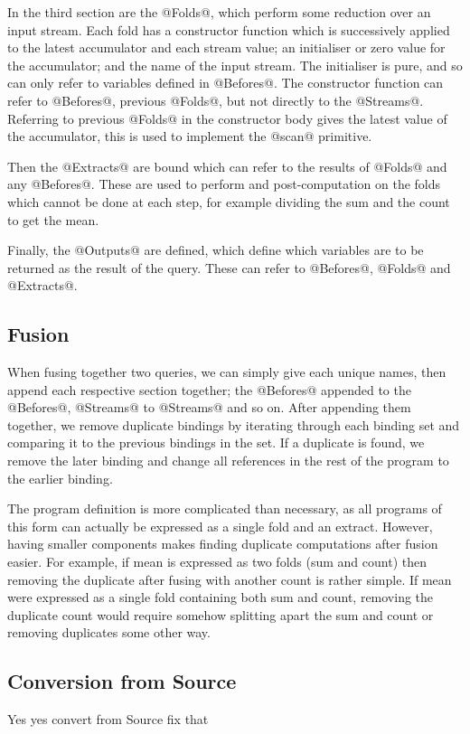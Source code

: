 In the third section are the @Folds@, which perform some reduction over an input stream.
Each fold has a constructor function which is successively applied to the latest accumulator and each stream value; an initialiser or zero value for the accumulator; and the name of the input stream.
The initialiser is pure, and so can only refer to variables defined in @Befores@.
The constructor function can refer to @Befores@, previous @Folds@, but not directly to the @Streams@.
Referring to previous @Folds@ in the constructor body gives the latest value of the accumulator, this is used to implement the @scan@ primitive.

Then the @Extracts@ are bound which can refer to the results of @Folds@ and any @Befores@.
These are used to perform and post-computation on the folds which cannot be done at each step, for example dividing the sum and the count to get the mean.

Finally, the @Outputs@ are defined, which define which variables are to be returned as the result of the query.
These can refer to @Befores@, @Folds@ and @Extracts@.

\subsection{Fusion}

When fusing together two queries, we can simply give each unique names, then append each respective section together; the @Befores@ appended to the @Befores@, @Streams@ to @Streams@ and so on.
After appending them together, we remove duplicate bindings by iterating through each binding set and comparing it to the previous bindings in the set.
If a duplicate is found, we remove the later binding and change all references in the rest of the program to the earlier binding.

The program definition is more complicated than necessary, as all programs of this form can actually be expressed as a single fold and an extract.
However, having smaller components makes finding duplicate computations after fusion easier.
For example, if mean is expressed as two folds (sum and count) then removing the duplicate after fusing with another count is rather simple.
If mean were expressed as a single fold containing both sum and count, removing the duplicate count would require somehow splitting apart the sum and count or removing duplicates some other way.


\subsection{Conversion from Source}

Yes yes convert from Source fix that

% 

